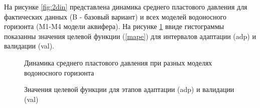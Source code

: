 \documentclass{article}
\begin{document}
На рисунке \ref{fig:2din} представлена динамика среднего пластового давления для фактических данных (B - базовый вариант) и всех моделей водоносного горизонта (M1-M4 модели аквифера). На рисунке \ref{fig:hist} ввиде гистограммы показанны значения целевой функции (\ref{mape}) для интервалов адаптации (adp) и валидации (val).
\begin{figure} 
    \begin{minipage}[h]{0.48\linewidth}
      \caption{Динамика среднего пластового давления при разных моделях водоносного горизонта}
      \label{fig:din}
    \end{minipage} \hfill
    \begin{minipage}[h]{0.48\linewidth}
      \caption{Значения целевой функции для этапов адаптации (adp) и валидации (val)}
      \label{fig:hist}
    \end{minipage} 
\end{figure}
\end{document}
